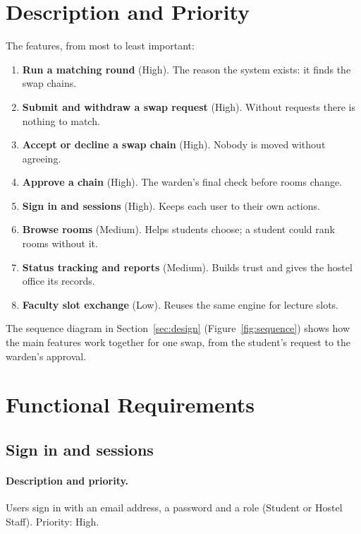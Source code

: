 \documentclass[11pt,a4paper,parskip=half,toc=listof]{scrreprt}
\begin{document}
\section{Description and Priority}

The features, from most to least important:

\begin{enumerate}
  \item \textbf{Run a matching round} (High). The reason the system
    exists: it finds the swap chains.
  \item \textbf{Submit and withdraw a swap request} (High). Without
    requests there is nothing to match.
  \item \textbf{Accept or decline a swap chain} (High). Nobody is moved
    without agreeing.
  \item \textbf{Approve a chain} (High). The warden's final check before
    rooms change.
  \item \textbf{Sign in and sessions} (High). Keeps each user to their own
    actions.
  \item \textbf{Browse rooms} (Medium). Helps students choose; a student
    could rank rooms without it.
  \item \textbf{Status tracking and reports} (Medium). Builds trust and
    gives the hostel office its records.
  \item \textbf{Faculty slot exchange} (Low). Reuses the same
    engine for lecture slots.
\end{enumerate}

The sequence diagram in Section~\ref{sec:design}
(Figure~\ref{fig:sequence}) shows how the main features work together for
one swap, from the student's request to the warden's approval.

\section{Functional Requirements}

\subsection{Sign in and sessions}

\paragraph{Description and priority.} Users sign in with an email address,
a password and a role (Student or Hostel Staff). Priority: High.
\end{document}
